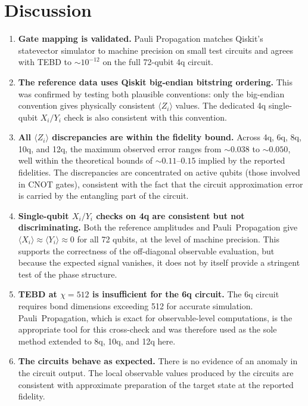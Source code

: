 \documentclass[11pt]{article}
\begin{document}
\section{Discussion}

\begin{enumerate}
  \item \textbf{Gate mapping is validated.}
    Pauli Propagation matches Qiskit's statevector simulator to machine precision on small test circuits and agrees with TEBD to $\sim 10^{-12}$ on the full 72-qubit 4q circuit.

  \item \textbf{The reference data uses Qiskit big-endian bitstring ordering.}
    This was confirmed by testing both plausible conventions: only the big-endian convention gives physically consistent $\langle Z_i\rangle$ values.
    The dedicated 4q single-qubit $X_i/Y_i$ check is also consistent with this convention.

  \item \textbf{All $\langle Z_i \rangle$ discrepancies are within the fidelity bound.}
    Across 4q, 6q, 8q, 10q, and 12q, the maximum observed error ranges from $\sim 0.038$ to $\sim 0.050$, well within the theoretical bounds of $\sim 0.11$--$0.15$ implied by the reported fidelities.
    The discrepancies are concentrated on active qubits (those involved in CNOT gates), consistent with the fact that the circuit approximation error is carried by the entangling part of the circuit.

  \item \textbf{Single-qubit $X_i/Y_i$ checks on 4q are consistent but not discriminating.}
    Both the reference amplitudes and Pauli~Propagation give $\langle X_i\rangle \approx \langle Y_i\rangle \approx 0$ for all 72 qubits, at the level of machine precision.
    This supports the correctness of the off-diagonal observable evaluation, but because the expected signal vanishes, it does not by itself provide a stringent test of the phase structure.

  \item \textbf{TEBD at $\chi=512$ is insufficient for the 6q circuit.}
    The 6q circuit requires bond dimensions exceeding 512 for accurate simulation.
    Pauli~Propagation, which is exact for observable-level computations, is the appropriate tool for this cross-check and was therefore used as the sole method extended to 8q, 10q, and 12q here.

  \item \textbf{The circuits behave as expected.}
    There is no evidence of an anomaly in the circuit output.
    The local observable values produced by the circuits are consistent with approximate preparation of the target state at the reported fidelity.
\end{enumerate}
\end{document}

